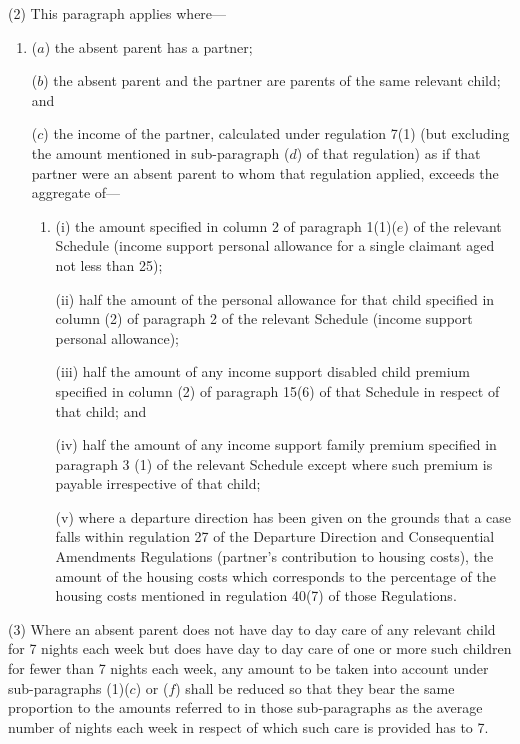 \documentclass[12pt,a4paper]{article}
\begin{document}
(2) This paragraph applies where—
\begin{enumerate}\item[]
($a$) the absent parent has a partner;

($b$) the absent parent and the partner are parents of the same relevant child; and

($c$) the income of the partner, calculated under regulation 7(1) 
(but excluding the amount mentioned in sub-paragraph ($d$) of that regulation) %
as if that partner were an absent parent to whom that regulation applied, exceeds the aggregate of—
\begin{enumerate}\item[]
(i) the amount specified in column 2 of paragraph 1(1)($e$) of the relevant Schedule (income support personal allowance for a single claimant aged not less than 25);

(ii) half the amount of the personal allowance for that child specified in column (2) of paragraph 2 of the relevant Schedule (income support personal allowance);

(iii) half the amount of any income support disabled child premium specified in column (2) of paragraph 15(6) of that Schedule in respect of that child;
and %

(iv) half the amount of any income support family premium specified in paragraph 
3%
  (1) %
of the relevant Schedule  %
except where such premium is payable irrespective of that child;%

(v) where a departure direction has been given on the grounds that a case falls
within regulation 27 of the Departure Direction and Consequential Amendments
Regulations (partner’s contribution to housing costs), the amount of the housing
costs which corresponds to the percentage of the housing costs mentioned in
regulation 40(7) of those Regulations.
\end{enumerate}
\end{enumerate}

(3) Where an absent parent does not have day to day care of any relevant child for 7 nights each week but does have day to day care of one or more such children for fewer than 7 nights each week, 
any amount  %
to be taken into account under sub-paragraphs (1)($c$) 
or ($f$)  %
shall be reduced so that they bear the same proportion to the amounts referred to in those sub-paragraphs as the average number of nights each week in respect of which such care is provided has to 7.
\end{document}
